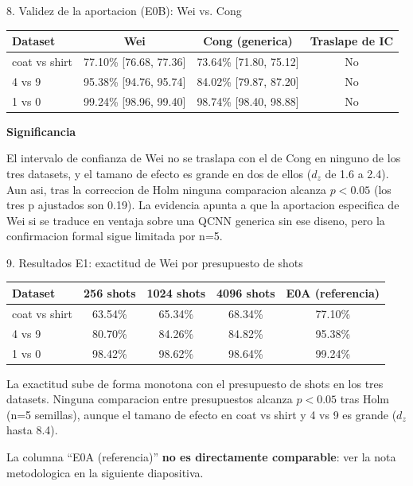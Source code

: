 \documentclass[aspectratio=169]{beamer}
\newcommand{\bmheading}[2]{\textbf{\color{#1}#2}\par\smallskip}
\newcommand{\bandedtable}{\rowcolors{2}{white}{bmRowAlt}}
\begin{document}
\begin{frame}{8. Validez de la aportacion (E0B): Wei vs. Cong}
  \footnotesize
  \bandedtable
  \begin{tabular}{@{}lccc@{}}
    \toprule
    \textbf{Dataset} & \textbf{Wei} & \textbf{Cong (generica)} & \textbf{Traslape de IC} \\
    \midrule
    coat vs shirt & 77.10\% [76.68, 77.36] & 73.64\% [71.80, 75.12] & No \\
    4 vs 9        & 95.38\% [94.76, 95.74] & 84.02\% [79.87, 87.20] & No \\
    1 vs 0        & 99.24\% [98.96, 99.40] & 98.74\% [98.40, 98.88] & No \\
    \bottomrule
  \end{tabular}

  \vspace{10pt}
  \begin{amberbox}
    \bmheading{bmAmber}{Significancia}
    El intervalo de confianza de Wei no se traslapa con el de Cong en ninguno
    de los tres datasets, y el tamano de efecto es grande en dos de ellos
    ($d_z$ de 1.6 a 2.4). Aun asi, tras la correccion de Holm ninguna
    comparacion alcanza $p<0.05$ (los tres p ajustados son 0.19). La evidencia
    apunta a que la aportacion especifica de Wei si se traduce en ventaja
    sobre una QCNN generica sin ese diseno, pero la confirmacion formal sigue
    limitada por n=5.
  \end{amberbox}
\end{frame}

\begin{frame}{9. Resultados E1: exactitud de Wei por presupuesto de shots}
  \footnotesize
  \bandedtable
  \begin{tabular}{@{}lcccc@{}}
    \toprule
    \textbf{Dataset} & \textbf{256 shots} & \textbf{1024 shots} & \textbf{4096 shots} &
      \textbf{E0A (referencia)} \\
    \midrule
    coat vs shirt & 63.54\% & 65.34\% & 68.34\% & 77.10\% \\
    4 vs 9        & 80.70\% & 84.26\% & 84.82\% & 95.38\% \\
    1 vs 0        & 98.42\% & 98.62\% & 98.64\% & 99.24\% \\
    \bottomrule
  \end{tabular}

  \vspace{10pt}
  La exactitud sube de forma monotona con el presupuesto de shots en los tres
  datasets. Ninguna comparacion entre presupuestos alcanza $p<0.05$ tras Holm
  (n=5 semillas), aunque el tamano de efecto en coat vs shirt y 4 vs 9 es
  grande ($d_z$ hasta 8.4).

  \vspace{6pt}
  {\scriptsize\color{bmGrey} La columna ``E0A (referencia)'' \textbf{no es
  directamente comparable}: ver la nota metodologica en la siguiente
  diapositiva.}
\end{frame}
\end{document}
